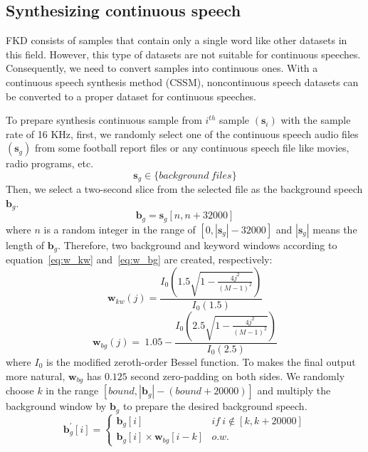 \documentclass{article}
\begin{document}
 \subsection{Synthesizing continuous speech}
 FKD consists of samples that contain only a single word like other datasets in this field. However, this type of datasets are not suitable for continuous speeches. Consequently, we need to convert samples into continuous ones. With a continuous speech synthesis method (CSSM), noncontinuous speech datasets can be converted to a proper dataset for continuous speeches.

To prepare synthesis continuous sample from $i^{th}$ sample $(\textbf{s}_i)$ with the sample rate of 16 KHz, first, we randomly select one of the continuous speech audio files $(\textbf{s}_g)$ from some football report files or any continuous speech file like movies, radio programs, etc.
\begin{equation*}
  \textbf{s}_g \in {\{background \ files\}}
\end{equation*}
Then, we select a two-second slice from the selected file as the background speech $\textbf{b}_g$.
\begin{equation*}
\textbf{b}_g = \textbf{s}_g[n, n+32000]
\end{equation*}
where $n$ is a random integer in the range of $[0,|\textbf{s}_g|-32000]$ and $|\textbf{s}_g|$ means the length of $\textbf{b}_g$. Therefore, two background and keyword windows according to equation~\ref{eq:w_kw} and~\ref{eq:w_bg} are created, respectively:
\begin{equation}
\textbf{w}_{kw}\left(j\right)=\frac{I_0\left(1.5\sqrt{1-\frac{4j^2}{\left(M-1\right)^2}}\right)}{I_0\left(1.5\right)}
\label{eq:w_kw}
\end{equation}
\begin{equation}
\textbf{w}_{bg}\left(j\right)=\ 1.05-\frac{I_0\left(2.5\sqrt{1-\frac{4j^2}{\left(M-1\right)^2}}\right)}{I_0\left(2.5\right)}
\label{eq:w_bg}
\end{equation}
where $I_0$ is the modified zeroth-order Bessel function. To makes the final output more natural, $\textbf{w}_{bg}$ has $0.125$ second zero-padding on both sides.
We randomly choose $k$ in the range $[bound, |\textbf{b}_g|-(bound+20000)]$ and multiply the background window by $\textbf{b}_g$ to prepare the desired background speech.
\begin{equation}
\textbf{b}^\prime_g[i] = \begin{cases}
\textbf{b}_g[i] & if\ i \notin [k,k+20000]\\
\textbf{b}_g[i]\times \textbf{w}_{bg}[i-k] &  o.w. \end{cases}
\end{equation}
\end{document}
